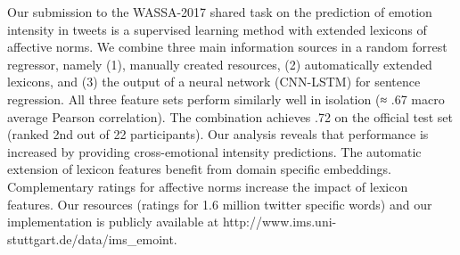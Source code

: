Our submission to the WASSA-2017 shared task on the prediction of emotion intensity in tweets is a supervised learning method with extended lexicons of affective norms. We combine three main information sources in a random forrest regressor, namely (1), manually created resources, (2) automatically extended lexicons, and (3) the output of a neural network (CNN-LSTM) for sentence regression. All three feature sets perform similarly well in isolation (≈ .67 macro average Pearson correlation). The combination achieves .72 on the official test set (ranked 2nd out of 22 participants). Our analysis reveals that performance is increased by providing cross-emotional intensity predictions. The automatic extension of lexicon features benefit from domain specific embeddings. Complementary ratings for affective norms increase the impact of lexicon features. Our resources (ratings for 1.6 million twitter specific words) and our implementation is publicly available at http://www.ims.uni-stuttgart.de/data/ims\_emoint.
